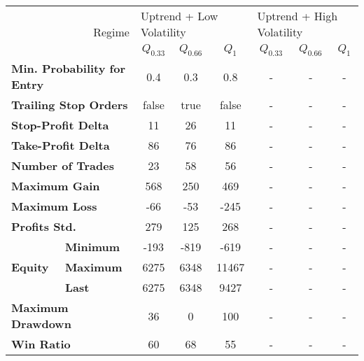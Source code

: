 \centering
\begin{tabular}{ll|cccccc}
    \toprule
    \multicolumn{2}{r|}{\multirow{2}{*}{Regime}} & \multicolumn{3}{l}{Uptrend + Low Volatility}     & \multicolumn{3}{l}{Uptrend + High Volatility}     \\
    \multicolumn{2}{r|}{} & $Q_{0.33}$ & $Q_{0.66}$ & $Q_{1}$ & $Q_{0.33}$ & $Q_{0.66}$ & $Q_{1}$ \\
    \midrule
    \multicolumn{2}{l|}{\textbf{Min. Probability for Entry}} & 0.4 & 0.3 & 0.8 & - & - & - \\
    \multicolumn{2}{l|}{\textbf{Trailing Stop Orders}} & false & true & false & - & - & - \\
    \multicolumn{2}{l|}{\textbf{Stop-Profit Delta}} & 11 & 26 & 11 & - & - & - \\
    \multicolumn{2}{l|}{\textbf{Take-Profit Delta}} & 86 & 76 & 86 & - & - & - \\
    \midrule
    \multicolumn{2}{l|}{\textbf{Number of Trades}} & 23 & 58 & 56 & - & - & - \\
    \multicolumn{2}{l|}{\textbf{Maximum Gain}} & 568 & 250 & 469 & - & - & - \\
    \multicolumn{2}{l|}{\textbf{Maximum Loss}} & -66 & -53 & -245 & - & - & - \\
    \multicolumn{2}{l|}{\textbf{Profits Std.}} & 279 & 125 & 268 & - & - & - \\
    \multirow{3}{*}{\textbf{Equity}} & \textbf{Minimum} & -193 & -819 & -619  & - & - & - \\
    & \textbf{Maximum} & 6275 & 6348 & 11467 & - & - & - \\
    & \textbf{Last}    & 6275 & 6348 & 9427  & - & - & - \\
    \multicolumn{2}{l|}{\textbf{Maximum Drawdown}} & 36 & 0 & 100 & - & - & - \\
    \multicolumn{2}{l|}{\textbf{Win Ratio}} & 60 & 68 & 55 & - & - & - \\
    \bottomrule
\end{tabular}